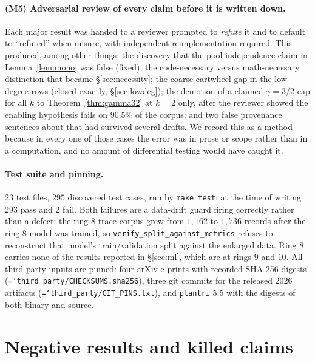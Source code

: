\documentclass[11pt]{article}
\theoremstyle{definition}
\newcommand{\art}[1]{{\texttt{\hyphenchar\font=`\-\relax #1}}}
\begin{document}
\paragraph{(M5) Adversarial review of every claim before it is written down.} Each
major result was handed to a reviewer prompted to \emph{refute} it and to default to
``refuted'' when unsure, with independent reimplementation required. This produced,
among other things: the discovery that the pool-independence claim in
Lemma~\ref{lem:mono} was false (fixed); the code-necessary versus math-necessary
distinction that became \S\ref{sec:necessity}; the coarse-cartwheel gap in the
low-degree rows (closed exactly, \S\ref{sec:lowdeg}); the demotion of a claimed
$\gamma=3/2$ cap for all $k$ to Theorem~\ref{thm:gamma32} at $k=2$ only, after the
reviewer showed the enabling hypothesis fails on $90.5\%$ of the corpus; and two
false provenance sentences about \cite{nl4ct2026} that had survived several drafts.
We record this as a method because in every one of those cases the error was in
prose or scope rather than in a computation, and no amount of differential testing
would have caught it.

\paragraph{Test suite and pinning.} $23$ test files, $295$ discovered test cases,
run by \texttt{make test}; at the time of writing $293$ pass and $2$ fail. Both
failures are a data-drift guard firing correctly rather than a defect: the ring-$8$
trace corpus grew from $1{,}162$ to $1{,}736$ records after the ring-$8$ model was
trained, so \texttt{verify\_split\_against\_metrics} refuses to reconstruct that
model's train/validation split against the enlarged data. Ring $8$ carries none of
the results reported in \S\ref{sec:ml}, which are at rings $9$ and $10$. All third-party inputs are pinned: four arXiv e-prints
with recorded SHA-256 digests (\art{third\_party/CHECKSUMS.sha256}), three git
commits for the released 2026 artifacts (\art{third\_party/GIT\_PINS.txt}), and
\texttt{plantri} 5.5 with the digests of both binary and source.



\section{Negative results and killed claims}
\label{sec:negative}
\end{document}
